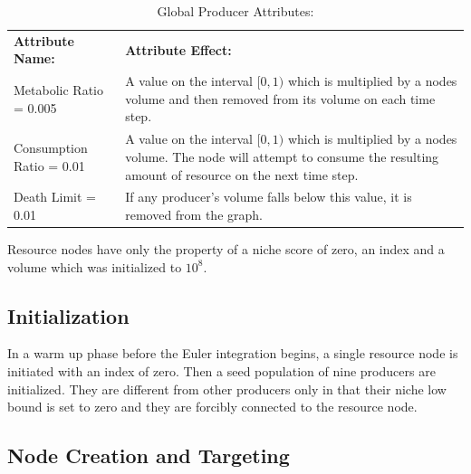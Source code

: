 \documentclass{paper}
\begin{document}
	\begin{table}[H]
	\begin{center}
		\caption {Global Producer Attributes:} \label{tab:title} 
		\begin{tabular}{|p{}|p{}|}
			\cline{1-2}
			\textbf{Attribute Name:} & \textbf{Attribute Effect:}  \\ \cline{1-2}
			Metabolic Ratio = 0.005 & A value on the interval $[0,1)$ which is multiplied by a nodes volume and then removed from its volume on each time step. \\ \cline{1-2}
			Consumption Ratio = 0.01 &  A value on the interval $[0,1)$ which is multiplied by a nodes volume. The node will attempt to consume the resulting amount of resource on the next time step. \\ \cline{1-2}
			Death Limit = 0.01 & If any producer's volume falls below this value, it is removed from the graph. \\ \cline{1-2}
		\end{tabular}
	\end{center}
\end{table}
	
	Resource nodes have only the property of a niche score of zero, an index and a volume which was initialized to $10^8$.
	
	\subsection{Initialization}
	
	In a warm up phase before the Euler integration begins, a single resource node is initiated with an index of zero. Then a seed population of nine producers are initialized. They are different from other producers only in that their niche low bound is set to zero and they are forcibly connected to the resource node.
	
	\subsection{Node Creation and Targeting}
	
\end{document}
